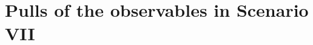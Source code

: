 \documentclass[10pt, a4paper]{article}
\begin{document}
\section*{Pulls of the observables in Scenario VII}

\end{document}
